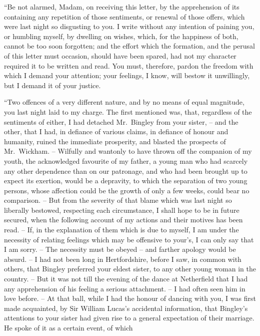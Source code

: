 \begin{letter}
“Be not alarmed, Madam, on receiving this letter, by
the apprehension of its containing any repetition of those
sentiments, or renewal of those offers, which were last
night so disgusting to you. I write without any intention
of paining you, or humbling myself, by dwelling on
wishes, which, for the happiness of both, cannot be too
soon forgotten; and the effort which the formation, and
the perusal of this letter must occasion, should have been
spared, had not my character required it to be written
and read. You must, therefore, pardon the freedom with
which I demand your attention; your feelings, I know,
will bestow it unwillingly, but I demand it of your justice.

“Two offences of a very different nature, and by no
means of equal magnitude, you last night laid to my
charge. The first mentioned was, that, regardless of the
sentiments of either, I had detached Mr.\ Bingley from
your sister, -- and the other, that I had, in defiance of
various claims, in defiance of honour and humanity, ruined
the immediate prosperity, and blasted the prospects of
Mr.\ Wickham. -- Wilfully and wantonly to have thrown off
the companion of my youth, the acknowledged favourite
of my father, a young man who had scarcely any other
dependence than on our patronage, and who had been
brought up to expect its exertion, would be a depravity,
to which the separation of two young persons, whose
affection could be the growth of only a few weeks, could
bear no comparison. -- But from the severity of that blame
which was last night so liberally bestowed, respecting each
circumstance, I shall hope to be in future secured, when
the following account of my actions and their motives
has been read. -- If, in the explanation of them which is
due to myself, I am under the necessity of relating feelings
which may be offensive to your’s, I can only say that I am
sorry. -- The necessity must be obeyed -- and farther apology
would be absurd. -- I had not been long in Hertfordshire,
before I saw, in common with others, that Bingley preferred
your eldest sister, to any other young woman in the
country. -- But it was not till the evening of the dance at
Netherfield that I had any apprehension of his feeling
a serious attachment. -- I had often seen him in love before.
-- At that ball, while I had the honour of dancing with
you, I was first made acquainted, by Sir William Lucas’s
accidental information, that Bingley’s attentions to your
sister had given rise to a general expectation of their
marriage. He spoke of it as a certain event, of which

\end{letter}
